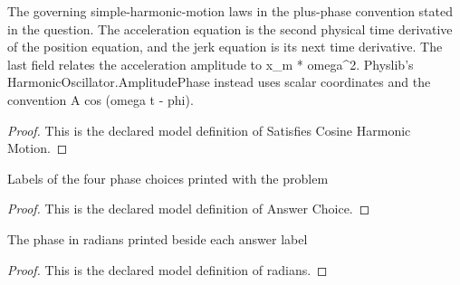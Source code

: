 \begin{definition}
  \label{def:physics:phyx-mini-0277:phyxminiproblems-problemphyxmini0277-satisfiescosineharmonicmotion}
  The governing simple-harmonic-motion laws in the plus-phase convention stated in the question. The acceleration equation is the second physical time derivative of the position equation, and the jerk equation is its next time derivative. The last field relates the acceleration amplitude to x\_m * omega\textasciicircum{}2. Physlib's HarmonicOscillator.AmplitudePhase instead uses scalar coordinates and the convention A cos (omega t - phi).
\end{definition}
\begin{proof}
  This is the declared model definition of Satisfies Cosine Harmonic Motion.
\end{proof}
\begin{definition}
  \label{def:physics:phyx-mini-0277:phyxminiproblems-problemphyxmini0277-answerchoice}
  Labels of the four phase choices printed with the problem
\end{definition}
\begin{proof}
  This is the declared model definition of Answer Choice.
\end{proof}
\begin{definition}[radians]
  \label{def:physics:phyx-mini-0277:phyxminiproblems-problemphyxmini0277-answerchoice-radians}
  The phase in radians printed beside each answer label
\end{definition}
\begin{proof}
  This is the declared model definition of radians.
\end{proof}
